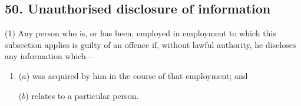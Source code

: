 \documentclass[12pt,a4paper]{article}
\begin{document}
%
%
%
%
%
%
%


\subsection{50. Unauthorised disclosure of information}

(1) Any person who is, or has been, employed in employment to which 
this subsection  %
applies is guilty of an offence if, without lawful authority, he discloses any information which—
\begin{enumerate}\item[]
($a$) was acquired by him in the course of that employment; and

($b$) relates to a particular person.
\end{enumerate}
\end{document}
